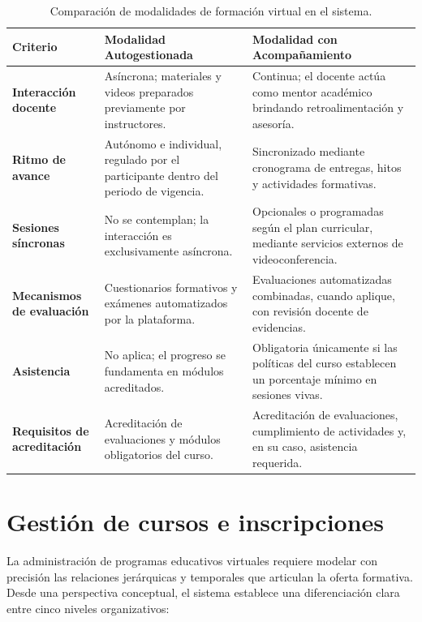 \begin{table}[htbp]
\centering
\caption{Comparación de modalidades de formación virtual en el sistema.}
\label{tabla:modalidades_virtuales}
\small
\begin{tabularx}{\textwidth}{|p{3.2cm}|X|X|}
\hline
\rowcolor[gray]{0.9}
\textbf{Criterio} & \textbf{Modalidad Autogestionada} & \textbf{Modalidad con Acompañamiento} \\
\hline
\textbf{Interacción docente} & Asíncrona; materiales y videos preparados previamente por instructores. & Continua; el docente actúa como mentor académico brindando retroalimentación y asesoría. \\
\hline
\textbf{Ritmo de avance} & Autónomo e individual, regulado por el participante dentro del periodo de vigencia. & Sincronizado mediante cronograma de entregas, hitos y actividades formativas. \\
\hline
\textbf{Sesiones síncronas} & No se contemplan; la interacción es exclusivamente asíncrona. & Opcionales o programadas según el plan curricular, mediante servicios externos de videoconferencia. \\
\hline
\textbf{Mecanismos de evaluación} & Cuestionarios formativos y exámenes automatizados por la plataforma. & Evaluaciones automatizadas combinadas, cuando aplique, con revisión docente de evidencias. \\
\hline
\textbf{Asistencia} & No aplica; el progreso se fundamenta en módulos acreditados. & Obligatoria únicamente si las políticas del curso establecen un porcentaje mínimo en sesiones vivas. \\
\hline
\textbf{Requisitos de acreditación} & Acreditación de evaluaciones y módulos obligatorios del curso. & Acreditación de evaluaciones, cumplimiento de actividades y, en su caso, asistencia requerida. \\
\hline
\end{tabularx}
\end{table}

\section{Gestión de cursos e inscripciones}

La administración de programas educativos virtuales requiere modelar con precisión las relaciones jerárquicas y temporales que articulan la oferta formativa. Desde una perspectiva conceptual, el sistema establece una diferenciación clara entre cinco niveles organizativos:


